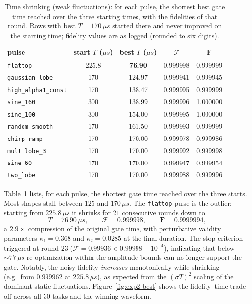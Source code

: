 \documentclass{simple-notes}
\newcommand{\closef}{\mathbf{F}}
\newcommand{\openf}{\mathcal{F}}
\begin{document}
\begin{table}[htbp]
    \centering
    \begin{tabular}{lcccc}
        \hline
        pulse & start $T$ ($\mu s$) & best $T$ ($\mu s$) & $\openf$ & $\closef$ \\
        \hline
        \texttt{flattop}            & 225.8 & \textbf{76.90} & 0.999998 & 0.999999 \\
        \texttt{gaussian\_lobe}     & 170   & 124.97 & 0.999941 & 0.999945 \\
        \texttt{high\_alpha1\_const}& 170   & 138.47 & 0.999995 & 0.999999 \\
        \texttt{sine\_160}          & 300   & 138.99 & 0.999996 & 1.000000 \\
        \texttt{sine\_100}          & 300   & 154.00 & 0.999995 & 1.000000 \\
        \texttt{random\_smooth}     & 170   & 161.50 & 0.999993 & 0.999999 \\
        \texttt{chirp\_ramp}        & 170   & 170.00 & 0.999978 & 0.999986 \\
        \texttt{multilobe\_3}       & 170   & 170.00 & 0.999992 & 0.999998 \\
        \texttt{sine\_60}           & 170   & 170.00 & 0.999947 & 0.999954 \\
        \texttt{two\_lobe}          & 170   & 170.00 & 0.999988 & 0.999996 \\
        \hline
    \end{tabular}
    \caption{Time shrinking (weak fluctuations): for each pulse, the shortest best gate time reached over the three starting times, with the fidelities of that round. Rows with best $T = 170\,\mu s$ started there and never improved on the starting time; fidelity values are as logged (rounded to six digits).}
    \label{tab:exp2-shrink}
\end{table}

Table~\ref{tab:exp2-shrink} lists, for each pulse, the shortest gate time reached over the three starts. Most shapes stall between $125$ and $170\,\mu s$. The \texttt{flattop} pulse is the outlier: starting from $225.8\,\mu s$ it shrinks for $21$ consecutive rounds down to
\begin{equation*}
    T = 76.90\,\mu s, \qquad \openf = 0.999998, \qquad \closef = 0.9999994,
\end{equation*}
a $2.9\times$ compression of the original gate time, with perturbative validity parameters $\kappa_1 = 0.368$ and $\kappa_2 = 0.0285$ at the final duration. The stop criterion triggered at round $23$ ($\openf = 0.99936 < 0.99998 - 10^{-4}$), indicating that below ${\sim}77\,\mu s$ re-optimization within the amplitude bounds can no longer support the gate. Notably, the noisy fidelity \emph{increases} monotonically while shrinking (e.g.\ from $0.999962$ at $225.8\,\mu s$), as expected from the $(\sigma T)^2$ scaling of the dominant static fluctuations. Figure~\ref{fig:exp2-best} shows the fidelity--time trade-off across all $30$ tasks and the winning waveform.
\end{document}

